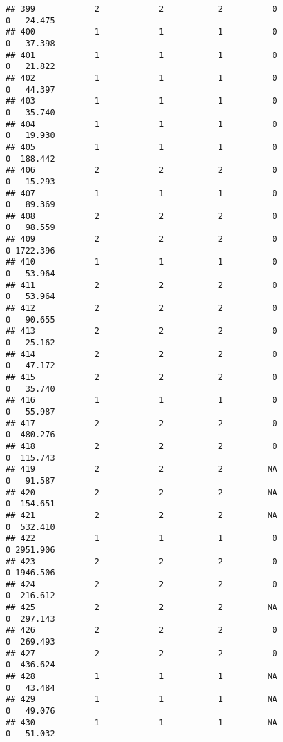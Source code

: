 \documentclass[
]{article}
\begin{document}
\begin{verbatim}
## 399            2            2           2          0                0   24.475
## 400            1            1           1          0                0   37.398
## 401            1            1           1          0                0   21.822
## 402            1            1           1          0                0   44.397
## 403            1            1           1          0                0   35.740
## 404            1            1           1          0                0   19.930
## 405            1            1           1          0                0  188.442
## 406            2            2           2          0                0   15.293
## 407            1            1           1          0                0   89.369
## 408            2            2           2          0                0   98.559
## 409            2            2           2          0                0 1722.396
## 410            1            1           1          0                0   53.964
## 411            2            2           2          0                0   53.964
## 412            2            2           2          0                0   90.655
## 413            2            2           2          0                0   25.162
## 414            2            2           2          0                0   47.172
## 415            2            2           2          0                0   35.740
## 416            1            1           1          0                0   55.987
## 417            2            2           2          0                0  480.276
## 418            2            2           2          0                0  115.743
## 419            2            2           2         NA                0   91.587
## 420            2            2           2         NA                0  154.651
## 421            2            2           2         NA                0  532.410
## 422            1            1           1          0                0 2951.906
## 423            2            2           2          0                0 1946.506
## 424            2            2           2          0                0  216.612
## 425            2            2           2         NA                0  297.143
## 426            2            2           2          0                0  269.493
## 427            2            2           2          0                0  436.624
## 428            1            1           1         NA                0   43.484
## 429            1            1           1         NA                0   49.076
## 430            1            1           1         NA                0   51.032

\end{verbatim}
\end{document}
